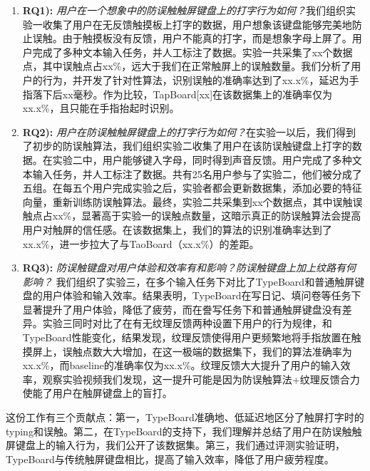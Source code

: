 \begin{enumerate}
	\item{\textbf{RQ1):} \emph{用户在一个想象中的防误触触屏键盘上的打字行为如何？}我们组织实验一收集了用户在无反馈触摸板上打字的数据，用户想象该键盘能够完美地防止误触。由于触摸板没有反馈，用户不能真的打字，而是想象字母上屏了。用户完成了多种文本输入任务，并人工标注了数据。实验一共采集了xx个数据点，其中误触点占xx\%，远大于我们在正常触屏上的误触数量。我们分析了用户的行为，并开发了针对性算法，识别误触的准确率达到了xx.x\%，延迟为手指落下后xx毫秒。作为比较，TapBoard[xx]在该数据集上的准确率仅为xx.x\%，且只能在手指抬起时识别。}
	\item{\textbf{RQ2):} \emph{用户在防误触触屏键盘上的打字行为如何？}在实验一以后，我们得到了初步的防误触算法，我们组织实验二收集了用户在该防误触键盘上打字的数据。在实验二中，用户能够键入字母，同时得到声音反馈。用户完成了多种文本输入任务，并人工标注了数据。共有25名用户参与了实验二，他们被分成了五组。在每五个用户完成实验之后，实验者都会更新数据集，添加必要的特征向量，重新训练防误触算法。最终，实验二共采集到xx个数据点，其中误触误触点占xx\%，显著高于实验一的误触点数量，这暗示真正的防误触算法会提高用户对触屏的信任感。在该数据集上，我们的算法的识别准确率达到了xx.x\%，进一步拉大了与TaoBoard（xx.x\%）的差距。}
	\item{\textbf{RQ3):} \emph{防误触键盘对用户体验和效率有和影响？防误触键盘上加上纹路有何影响？} 我们组织了实验三，在多个输入任务下对比了TypeBoard和普通触屏键盘的用户体验和输入效率。结果表明，TypeBoard在写日记、填问卷等任务下显著提升了用户体验，降低了疲劳，而在誊写任务下和普通触屏键盘没有差异。实验三同时对比了在有无纹理反馈两种设置下用户的行为规律，和TypeBoard性能变化，结果发现，纹理反馈使得用户更频繁地将手指放置在触摸屏上，误触点数大大增加，在这一极端的数据集下，我们的算法准确率为xx.x\%，而baseline的准确率仅为xx.x\%。纹理反馈大大提升了用户的输入效率，观察实验视频我们发现，这一提升可能是因为防误触算法+纹理反馈合力使能了用户在触屏键盘上的盲打。}
\end{enumerate}

这份工作有三个贡献点：第一，TypeBoard准确地、低延迟地区分了触屏打字时的typing和误触。第二，在TypeBoard的支持下，我们理解并总结了用户在防误触触屏键盘上的输入行为，我们公开了该数据集。第三，我们通过评测实验证明，TypeBoard与传统触屏键盘相比，提高了输入效率，降低了用户疲劳程度。
